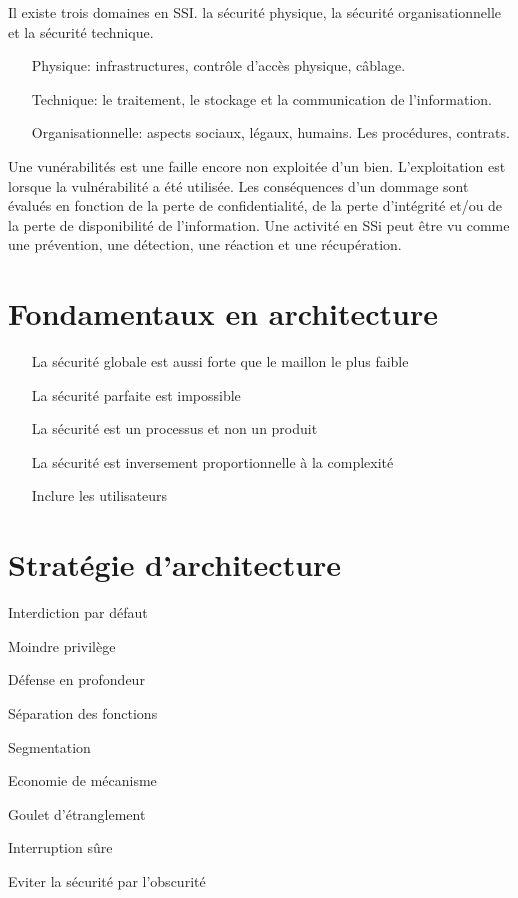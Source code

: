 \documentclass{article}
\begin{document}
Il existe trois domaines en SSI. la sécurité physique, la sécurité organisationnelle et la sécurité technique.

\bigskip
\begin{itemize}
	\item[Physique:] infrastructures, contrôle d'accès physique, câblage.
	\item[Technique:] le traitement, le stockage et la communication de l'information. 
	\item[Organisationnelle:]aspects sociaux, légaux, humains. Les procédures, contrats.
\end{itemize}
\bigskip
Une vunérabilités est une faille encore non exploitée d'un bien. L'exploitation est lorsque la vulnérabilité a été utilisée. Les conséquences d'un dommage sont évalués en fonction de la perte de confidentialité, de la perte d'intégrité et/ou de la perte de disponibilité de l'information. 
Une activité en SSi peut être vu comme une prévention, une détection, une réaction et une récupération. 

\section{Fondamentaux en architecture}
\bigskip
\begin{itemize}
	\item[La sécurité globale est aussi forte que le maillon le plus faible]
	\item[La sécurité parfaite est impossible]
	\item[La sécurité est un processus et non un produit]
	\item[La sécurité est inversement proportionnelle à la complexité]
	\item[Inclure les utilisateurs]
\end{itemize}
\bigskip

\section{Stratégie d'architecture}
\bigskip
\begin{itemize}
\end{itemize}
	\item[Interdiction par défaut]
	\item[Moindre privilège]
	\item[Défense en profondeur]
	\item[Séparation des fonctions]
	\item[Segmentation]
	\item[Economie de mécanisme]
	\item[Goulet d'étranglement]
	\item[Interruption sûre]
	\item[Eviter la sécurité par l'obscurité]
\bigskip
\end{document}
